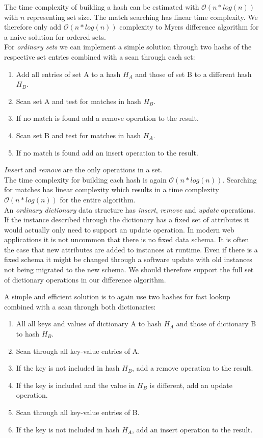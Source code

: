 The time complexity of building a hash can be estimated with $ \mathcal O(n * log(n)) $ with $ n $ representing set size.
The match searching has linear time complexity.
We therefore only add $ \mathcal O(n * log(n)) $ complexity to Myers difference algorithm for a naive solution for ordered sets.\\

For \emph{ordinary sets} we can implement a simple solution through two hashs of the respective set entries combined with a scan through each set:

\begin{enumerate}
\item Add all entries of set A to a hash $ H_A $ and those of set B to a different hash $ H_B $.
\item Scan set A and test for matches in hash $ H_B $.
\item If no match is found add a remove operation to the result.
\item Scan set B and test for matches in hash $ H_A $.
\item If no match is found add an insert operation to the result.
\end{enumerate}

\emph{Insert} and \emph{remove} are the only operations in a set.\\
The time complexity for building each hash is again $ \mathcal O(n * log(n)) $.
Searching for matches has linear complexity which results in a time complexity $ \mathcal O(n * log(n)) $ for the entire algorithm.\\

An \emph{ordinary dictionary} data structure has \emph{insert}, \emph{remove} and \emph{update} operations.
If the instance described through the dictionary has a fixed set of attributes it would actually only need to support an update operation.
In modern web applications it is not uncommon that there is no fixed data schema.
It is often the case that new attributes are added to instances at runtime.
Even if there is a fixed schema it might be changed through a software update with old instances not being migrated to the new schema.
We should therefore support the full set of dictionary operations in our difference algorithm.

A simple and efficient solution is to again use two hashes for fast lookup combined with a scan through both dictionaries:

\begin{enumerate}
\item All all keys and values of dictionary A to hash $ H_A $ and those of dictionary B to hash $ H_B $.
\item Scan through all key-value entries of A.
\item If the key is not included in hash $ H_B $, add a remove operation to the result.
\item If the key is included and the value in $ H_B $ is different, add an update operation.
\item Scan through all key-value entries of B.
\item If the key is not included in hash $ H_A $, add an insert operation to the result.
\end{enumerate}

